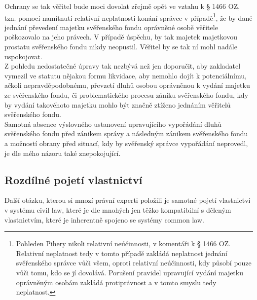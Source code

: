 \documentclass{article}
\begin{document}
Ochrany se tak věřitel bude moci dovolat zřejmě opět ve vztahu k § 1466 OZ, tzn. pomocí namítnutí relativní neplatnosti konání správce v případě\footnote{Pohleden Pihery nikoli relativní neúčinnosti, v komentáři k § 1466 OZ. Relativní neplatnost tedy v tomto případě zakládá neplatnost jednání svěřenského správce vůči všem, oproti relativní neúčinnosti, kdy působí pouze vůči tomu, kdo se jí dovolává. Porušení pravidel upravující vydání majetku oprávněným osobám zakládá protiprávnost a v tomto smyslu tedy neplatnost.}, že by dané jednání převedení majetku svěřenského fondu oprávněné osobě věřitele poškozovalo na jeho právech. V případě úspěchu, by tak majetek majetkovou prostatu svěřenského fondu nikdy neopustil. Věřitel by se tak ní mohl nadále uspokojovat.\\

Z pohledu nedostatečné úpravy tak nezbývá než jen doporučit, aby zakladatel vymezil ve statutu nějakou formu likvidace, aby nemohlo dojít k potenciálnímu, ačkoli nepravděpodobnému, převzetí dluhů osobou oprávněnou k vydání majetku ze svěřenského fondu, či problematického procesu zániku svěřenského fondu, kdy by vydání takovéhoto majetku mohlo být značně ztíženo jednáním věřitelů svěřenského fondu.\\

Samotná absence výslovného ustanovení upravujícího vypořádání dluhů svěřenského fondu před zánikem správy a následným zánikem svěřenského fondu a možností obrany před situací, kdy by svěřenský správce vypořádání neprovedl, je dle mého názoru také znepokojující.\\





\subsection{Rozdílné pojetí vlastnictví}

Další otázku, kterou si mnozí právní experti položili je samotné pojetí vlastnictví v systému civil law, které je dle mnohých jen těžko kompatibilní s děleným vlastnictvím, které je inherentně spojeno se systémy common law.\\
\end{document}
